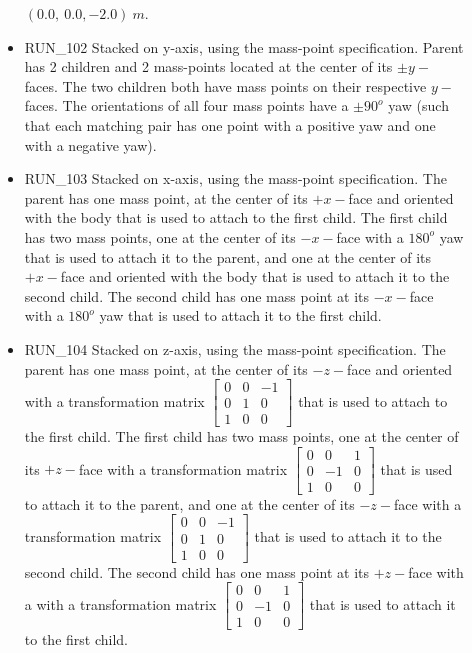 \begin{description}
\begin{itemize}
 $(0.0,~0.0,-2.0)~m$.
 \item RUN\_102 Stacked on y-axis, using the mass-point specification.  
 Parent has 2 
 children and 2 mass-points located at the center of its $\pm y-$faces.  The 
 two children both have mass points on their respective $y-$faces.  The 
 orientations of all four mass points have a $\pm 90^o$ yaw (such that each 
 matching pair has one point with a positive yaw and one with a negative yaw).
 \item RUN\_103 Stacked on x-axis, using the mass-point specification.
 The parent has
 one mass point, at the center of its $+x-$face and oriented with the body 
 that is used to attach to the first child.  The first child has two mass 
 points, one at the center of its $-x-$face with a $180^o$ yaw that is used 
 to attach it to the parent, and one at the center of its $+x-$face and 
 oriented with the body that is used to attach it to the second child.  The 
 second child has one mass point at its $-x-$face with a $180^o$ yaw that is 
 used to attach it to the first child.
 \item RUN\_104 Stacked on z-axis, using the mass-point specification. 
 The parent has 
 one mass point, at the center of its $-z-$face and oriented with a 
 transformation matrix $\begin{bmatrix} 0 & 0 & -1 \\ 0 & 1 & 0 \\ 1 & 0 & 0 
 \end{bmatrix}$ that is used to attach to the first child.  The first child 
 has two mass points, one at the center of its $+z-$face with a transformation 
 matrix $\begin{bmatrix} 0 & 0 & 1 \\ 0 & -1 & 0 \\ 1 & 0 & 0 \end{bmatrix}$ 
 that is used to attach it to the parent, and one at the center of its 
 $-z-$face with a transformation matrix $\begin{bmatrix} 0 & 0 & -1 \\ 0 & 1 & 
 0 \\ 1 & 0 & 0 \end{bmatrix}$ that is used to attach it to the second child.  
 The second child has one mass point at its $+z-$face with a with a 
 transformation matrix $\begin{bmatrix} 0 & 0 & 1 \\ 0 & -1 & 0 \\ 1 & 0 & 0 
 \end{bmatrix}$ that is used to attach it to the first child.
\end{itemize}


\end{description}
